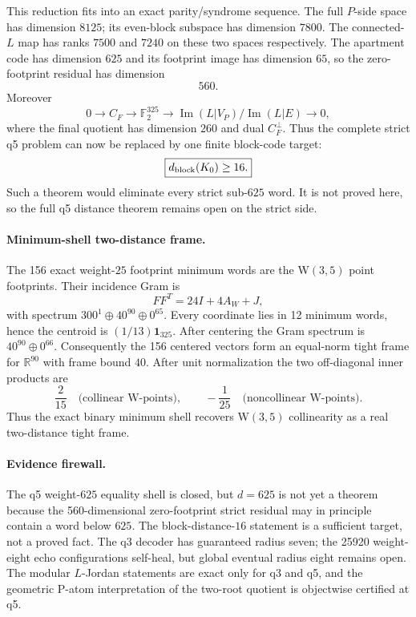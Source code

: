 This reduction fits into an exact parity/syndrome sequence.  The full $P$-side space has dimension $8125$; its even-block subspace has dimension $7800$.  The connected-$L$ map has ranks $7500$ and $7240$ on these two spaces respectively.  The apartment code has dimension $625$ and its footprint image has dimension $65$, so the zero-footprint residual has dimension
\[
 \boxed{560}.
\]
Moreover
\[
 0\longrightarrow C_F\longrightarrow\mathbb F_2^{325}
 \longrightarrow
 \operatorname{Im}(L|V_P)/\operatorname{Im}(L|E)
 \longrightarrow0,
\]
where the final quotient has dimension $260$ and dual $C_F^\perp$.  Thus the complete strict q5 problem can now be replaced by one finite block-code target:
\[
 \boxed{d_{\rm block}(K_0)\ge16.}
\]
Such a theorem would eliminate every strict sub-$625$ word.  It is not proved here, so the full q5 distance theorem remains open on the strict side.

\paragraph{Minimum-shell two-distance frame.}
The 156 exact weight-$25$ footprint minimum words are the W$(3,5)$ point footprints.  Their incidence Gram is
\[
 FF^T=24I+4A_W+J,
\]
with spectrum $300^1\oplus40^{90}\oplus0^{65}$.  Every coordinate lies in 12 minimum words, hence the centroid is $(1/13)\mathbf1_{325}$.  After centering the Gram spectrum is $40^{90}\oplus0^{66}$.  Consequently the 156 centered vectors form an equal-norm tight frame for $\mathbb R^{90}$ with frame bound $40$.  After unit normalization the two off-diagonal inner products are
\[
 \boxed{\frac{2}{15}\quad\text{(collinear W-points)},\qquad
       -\frac1{25}\quad\text{(noncollinear W-points)}.}
\]
Thus the exact binary minimum shell recovers W$(3,5)$ collinearity as a real two-distance tight frame.

\paragraph{Evidence firewall.}
The q5 weight-$625$ equality shell is closed, but $d=625$ is not yet a theorem because the 560-dimensional zero-footprint strict residual may in principle contain a word below $625$.  The block-distance-$16$ statement is a sufficient target, not a proved fact.  The q3 decoder has guaranteed radius seven; the 25920 weight-eight echo configurations self-heal, but global eventual radius eight remains open.  The modular $L$-Jordan statements are exact only for q3 and q5, and the geometric P-atom interpretation of the two-root quotient is objectwise certified at q5.
\fi
